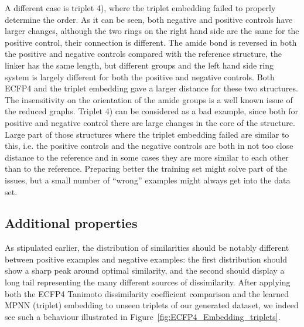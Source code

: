 \documentclass[doublespacing]{bmcart}
\begin{document}
A different case is triplet 4), where the triplet embedding failed to properly determine the order. As it can be seen, both negative and positive controls have larger changes, although the two rings on the right hand side are the same for the positive control, their connection is different. The amide bond is reversed in both the positive and negative controls compared with the reference structure, the linker has the same length, but different groups and the left hand side ring system is largely different for both the positive and negative controls. Both ECFP4 and the triplet embedding gave a larger distance for these two structures. The insensitivity on the orientation of the amide groups is a well known issue of the reduced graphs. Triplet 4) can be considered as a bad example, since both for positive and negative control there are large changes in the core of the structure. Large part of those structures where the triplet embedding failed are similar to this, i.e. the positive controls and the negative controls are both in not too close distance to the reference and in some cases they are more similar to each other than to the reference. Preparing better the training set might solve part of the issues, but a small number of ``wrong'' examples might always get into the data set.

\subsection*{Additional properties}
As stipulated earlier, the distribution of similarities should be notably different between positive examples and negative examples: the first distribution should show a sharp peak around optimal similarity, and the second should display a long tail representing the many different sources of dissimilarity. After applying both the ECFP4 Tanimoto dissimilarity coefficient comparison and the learned MPNN (triplet) embedding to unseen triplets of our generated dataset, we indeed see such a behaviour illustrated in Figure~\ref{fig:ECFP4_Embedding_triplets}.
\end{document}
